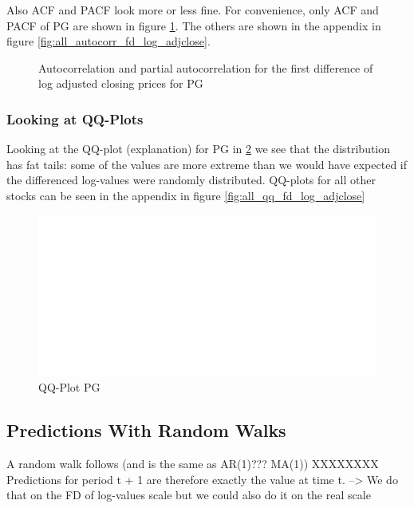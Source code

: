 Also ACF and PACF look more or less fine. For convenience, only ACF and PACF of PG are shown in figure \ref{fig:PG_autocorr_fd_log_adjclose}. The others are shown in the appendix in figure \ref{fig:all_autocorr_fd_log_adjclose}.
\begin{figure}[H]
    \centering
    \begin{adjustbox}{width=.9\textwidth,center}
    
    \end{adjustbox}  
    \caption{Autocorrelation and partial autocorrelation for the first difference of log adjusted closing prices for PG}
    \label{fig:PG_autocorr_fd_log_adjclose}
\end{figure}{}


\subsubsection*{Looking at QQ-Plots}
Looking at the QQ-plot (explanation) for PG in \ref{fig:PG_qq_fd_log_adjclose} we see that the distribution has fat tails: some of the values are more extreme than we would have expected if the differenced log-values were randomly distributed. QQ-plots for all other stocks can be seen in the appendix in figure \ref{fig:all_qq_fd_log_adjclose}

\begin{figure}[h]
    \centering
    \begin{adjustbox}{width=.9\textwidth,center}
    \includegraphics[]{figures/PG_log_adjclose_fd_and_qq.pdf}
    \end{adjustbox}  
    \caption{QQ-Plot PG}
    \label{fig:PG_qq_fd_log_adjclose}
\end{figure}{}




\subsection{Predictions With Random Walks}
A random walk follows (and is the same as AR(1)??? MA(1))
XXXXXXXX
Predictions for period t + 1 are therefore exactly the value at time t. --> We do that on the FD of log-values scale but we could also do it on the real scale

